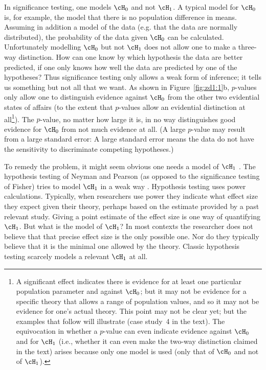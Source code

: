In significance testing, one models $\cH_0$ and not $\cH_1$. A typical model for $\cH_0$ is, for example, the model that there is no population difference in means. Assuming in addition a model of the data (e.g. that the data are normally distributed), the probability of the data given $\cH_0$ can be calculated. Unfortunately modelling $\cH_0$ but not $\cH_1$ does not allow one to make a three-way distinction. How can one know by which hypothesis the data are better predicted, if one only knows how well the data are predicted by one of the hypotheses? Thus significance testing only allows a weak form of inference; it tells us something but not all that we want. As shown in Figure~\ref{fig:zd1:1}b, $p$-values only allow one to distinguish evidence against $\cH_0$ from the other two evidential states of affairs (to the extent that $p$-values allow an evidential distinction at all\footnote{A significant effect indicates there is evidence for at least one particular population parameter and against $\cH_0$; but it may not be evidence for a specific theory that allows a range of population values, and so it may not be evidence for one’s actual theory. This point may not be clear yet; but the examples that follow will illustrate (case study~4 in the text). The equivocation in whether a $p$-value can even indicate evidence against $\cH_0$ and for $\cH_1$ (i.e., whether it can even make the two-way distinction claimed in the text) arises because only one model is used (only that of $\cH_0$ and not of $\cH_1$).}). The $p$-value, no matter how large it is, in no way distinguishes good evidence for $\cH_0$ from not much evidence at all. (A large $p$-value may result from a large standard error: A large standard error means the data do not have the sensitivity to discriminate competing hypotheses.)

To remedy the problem, it might seem obvious one needs a model of $\cH_1$ \cite{Dienes2016,Rouder2015}. The hypothesis testing of Neyman and Pearson (as opposed to the significance testing of Fisher) tries to model $\cH_1$ in a weak way \cite{Dienes2008}. Hypothesis testing uses power calculations. Typically, when researchers use power they indicate what effect size they expect given their theory, perhaps based on the estimate provided by a past relevant study. Giving a point estimate of the effect size is one way of quantifying $\cH_1$. But what is the model of $\cH_1$? In most contexts the researcher does not believe that that precise effect size is the only possible one. Nor do they typically believe that it is the minimal one allowed by the theory. Classic hypothesis testing scarcely models a relevant $\cH_1$ at all.

